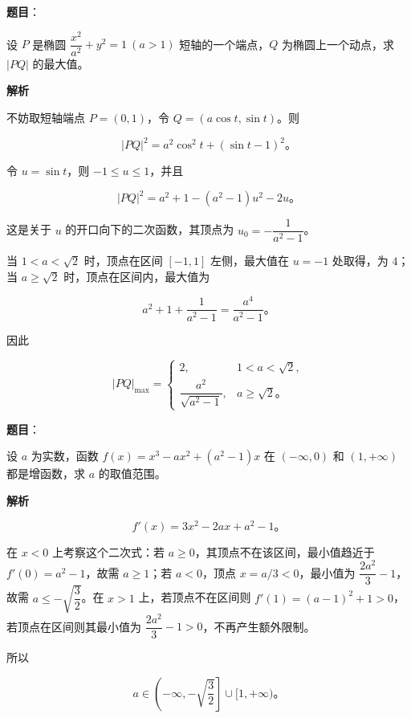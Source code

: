 \begin{answer}

\textbf{题目}：

设 $P$ 是椭圆 $\dfrac{x^2}{a^2}+y^2=1\ (a>1)$ 短轴的一个端点，$Q$ 为椭圆上一个动点，求 $|PQ|$ 的最大值。

\textbf{解析}

不妨取短轴端点 $P=(0,1)$，令 $Q=(a\cos t,\sin t)$。则

\nopagebreak[4]
\[
|PQ|^2=a^2\cos^2t+(\sin t-1)^2\text{。}
\]

令 $u=\sin t$，则 $-1\leqslant u\leqslant1$，并且

\nopagebreak[4]
\[
|PQ|^2=a^2+1-(a^2-1)u^2-2u\text{。}
\]

这是关于 $u$ 的开口向下的二次函数，其顶点为 $u_0=-\dfrac1{a^2-1}$。

当 $1<a<\sqrt2$ 时，顶点在区间 $[-1,1]$ 左侧，最大值在 $u=-1$ 处取得，为 $4$；当 $a\geqslant\sqrt2$ 时，顶点在区间内，最大值为

\nopagebreak[4]
\[
a^2+1+\frac1{a^2-1}=\frac{a^4}{a^2-1}\text{。}
\]

因此

\nopagebreak[4]
\[
|PQ|_{\max}=
\begin{cases}
2,&1<a<\sqrt2,\\[2pt]
\dfrac{a^2}{\sqrt{a^2-1}},&a\geqslant\sqrt2\text{。}
\end{cases}
\]


\end{answer}
\begin{answer}

\textbf{题目}：

设 $a$ 为实数，函数 $f(x)=x^3-ax^2+(a^2-1)x$ 在 $(-\infty,0)$ 和 $(1,+\infty)$ 都是增函数，求 $a$ 的取值范围。

\textbf{解析}

\nopagebreak[4]
\[
f'(x)=3x^2-2ax+a^2-1\text{。}
\]

在 $x<0$ 上考察这个二次式：若 $a\geqslant0$，其顶点不在该区间，最小值趋近于 $f'(0)=a^2-1$，故需 $a\geqslant1$；若 $a<0$，顶点 $x=a/3<0$，最小值为 $\dfrac{2a^2}{3}-1$，故需 $a\leqslant-\sqrt{\dfrac32}$。在 $x>1$ 上，若顶点不在区间则 $f'(1)=(a-1)^2+1>0$，若顶点在区间则其最小值为 $\dfrac{2a^2}{3}-1>0$，不再产生额外限制。

所以

\nopagebreak[4]
\[
a\in\left(-\infty,-\sqrt{\frac32}\right]\cup[1,+\infty)\text{。}
\]

\gkanswer{答案：$a\in\left(-\infty,-\sqrt{\dfrac32}\right]\cup[1,+\infty)$。}

\end{answer}